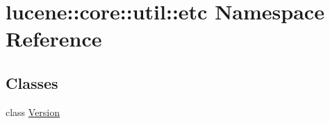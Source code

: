 \hypertarget{namespacelucene_1_1core_1_1util_1_1etc}{}\section{lucene\+:\+:core\+:\+:util\+:\+:etc Namespace Reference}
\label{namespacelucene_1_1core_1_1util_1_1etc}
\subsection*{Classes}
\begin{DoxyCompactItemize}
\item 
class \mbox{\hyperlink{classlucene_1_1core_1_1util_1_1etc_1_1Version}{Version}}
\end{DoxyCompactItemize}
